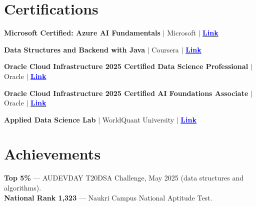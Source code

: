 \documentclass[a4paper,11pt]{article}
\begin{document}
\section{\textbf{Certifications}}
\begin{itemize}[leftmargin=0.05in, label={}]
  \small{
    \item \textbf{Microsoft Certified: Azure AI Fundamentals} $\vert$ Microsoft $\vert$ \href{https://drive.google.com/file/d/1nypwSHY39ZktbLtbP8Ya_CYGmbsn2g8f/view?usp=sharing}{\textcolor{blue}{\textbf{Link}}}\\
    \vspace{-6.5mm}
    \item \textbf{Data Structures and Backend with Java} $\vert$ Coursera $\vert$ \href{https://drive.google.com/file/d/1SdvRk6PBO6VIt_6LQol-nZmYosUmmgoN/view?usp=sharing}{\textcolor{blue}{\textbf{Link}}}\\
    \vspace{-6.5mm}
    \item \textbf{Oracle Cloud Infrastructure 2025 Certified Data Science Professional} $\vert$ Oracle $\vert$ \href{https://drive.google.com/file/d/1Q2dAdKuW7bo9yOs4gq8soPfN4qDZOFGs/view?usp=sharing}{\textcolor{blue}{\textbf{Link}}}\\
    \vspace{-6.5mm}
    \item \textbf{Oracle Cloud Infrastructure 2025 Certified AI Foundations Associate} $\vert$ Oracle $\vert$ \href{https://drive.google.com/file/d/1cpQH-lYc7DmQg9UHdZ-7dcmciYPLHpXu/view?usp=sharing}{\textcolor{blue}{\textbf{Link}}}\\
    \vspace{-6.5mm}
    \item \textbf{Applied Data Science Lab} $\vert$ WorldQuant University $\vert$ \href{https://drive.google.com/file/d/1MDyoU-A8llBpFbDF--DE8k4OrI6ITokM/view?usp=sharing}{\textcolor{blue}{\textbf{Link}}}
  }
\end{itemize}

\vspace{-8mm}

\section{\textbf{Achievements}}
 \begin{itemize}[leftmargin=0.05in, label={}]
    \small{\item{
     \textbf{Top 5\%}{ --- AUDEVDAY T20DSA Challenge, May 2025 (data structures and algorithms).} \\
     \textbf{National Rank 1,323}{ --- Naukri Campus National Aptitude Test.}
    }}
 \end{itemize}
 \vspace{-16pt}
\end{document}
